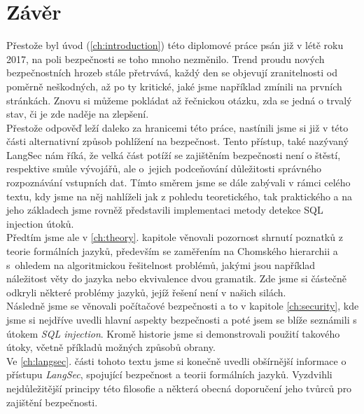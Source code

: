 
\chapter{Závěr} \label{ch:conclusion}
Přestože byl úvod (\ref{ch:introduction}) této diplomové práce psán již v létě roku 2017, na poli bezpečnosti se toho mnoho nezměnilo. Trend proudu 
nových bezpečnostních hrozeb stále přetrvává, každý den se objevují zranitelnosti od poměrně neškodných, až po ty kritické, jaké jsme například 
zmínili na prvních stránkách. Znovu si můžeme pokládat až řečnickou otázku, zda se jedná o trvalý stav, či je zde naděje na zlepšení. \\

Přestože odpověď leží daleko za hranicemi této práce, nastínili jsme si již v této části alternativní způsob pohlížení na bezpečnost. Tento přístup, 
také nazývaný LangSec nám říká, že velká část potíží se zajištěním bezpečnosti není o štěstí, respektive smůle vývojářů, ale o~jejich podceňování 
důležitosti správného rozpoznávání vstupních dat. Tímto směrem jsme se dále zabývali v rámci celého textu, kdy jsme na něj nahlíželi jak z pohledu 
teoretického, tak praktického a na jeho základech jsme rovněž představili implementaci metody detekce SQL injection útoků. \\

Předtím jsme ale v \ref{ch:theory}. kapitole věnovali pozornost shrnutí poznatků z teorie formálních jazyků, především se zaměřením na Chomského 
hierarchii a s~ohledem na algoritmickou řešitelnost problémů, jakými jsou například náležitost věty do jazyka nebo ekvivalence dvou gramatik. 
Zde jsme si částečně odkryli některé problémy jazyků, jejíž řešení není v našich silách. \\

Následně jsme se věnovali počítačové bezpečnosti a to v kapitole \ref{ch:security}, kde jsme si nejdříve uvedli hlavní aspekty bezpečnosti a poté 
jsem se blíže seznámili s útokem \textit{SQL injection}. Kromě historie jsme si demonstrovali použití takového útoky, včetně příkladů možných způsobů obrany. \\

Ve \ref{ch:langsec}. části tohoto textu jsme si konečně uvedli obšírnější informace o přístupu \textit{LangSec}, spojující bezpečnost a teorii formálních
jazyků. Vyzdvihli nejdůležitější principy této filosofie a některá obecná doporučení jeho tvůrců pro zajištění bezpečnosti. \\

